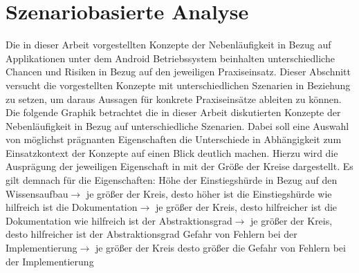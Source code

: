 \documentclass[12pt,oneside,a4paper,bibtotoc,liststotoc]{scrreprt}
\begin{document}
\section{Szenariobasierte Analyse}
Die in dieser Arbeit vorgestellten Konzepte der Nebenläufigkeit in Bezug auf Applikationen unter dem Android Betriebssystem beinhalten unterschiedliche Chancen und Risiken in Bezug auf den jeweiligen Praxiseinsatz. Dieser Abschnitt versucht die vorgestellten Konzepte mit unterschiedlichen Szenarien in Beziehung zu setzen, um daraus Aussagen für konkrete Praxiseinsätze ableiten zu können.\newline
Die folgende Graphik betrachtet die in dieser Arbeit diskutierten Konzepte der Nebenläufigkeit in Bezug auf unterschiedliche Szenarien. Dabei soll eine Auswahl von möglichst prägnanten Eigenschaften die Unterschiede in Abhängigkeit zum Einsatzkontext der Konzepte auf einen Blick deutlich machen. Hierzu wird die Ausprägung der jeweiligen Eigenschaft in mit der Größe der Kreise dargestellt. Es gilt demnach für die Eigenschaften:\newline \newline
\glqq Höhe der Einstiegshürde in Bezug auf den Wissensaufbau\grqq $\rightarrow$ je größer der Kreis, desto höher ist die Einstiegshürde \newline \newline
\glqq wie hilfreich ist die Dokumentation\grqq $\rightarrow$ je größer der Kreis, desto hilfreicher ist die Dokumentation\newline \newline
\glqq wie hilfreich ist der Abstraktionsgrad\grqq $\rightarrow$ je größer der Kreis, desto hilfreicher ist der Abstraktionsgrad\newline \newline
\glqq Gefahr von Fehlern bei der Implementierung\grqq $\rightarrow$ je größer der Kreis desto größer die Gefahr von Fehlern bei der Implementierung
\end{document}
